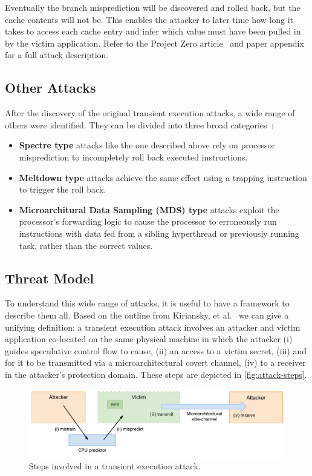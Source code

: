 Eventually the branch misprediction will be discovered and rolled back, but the cache contents will not be.
This enables the attacker to later time how long it takes to access each cache entry and infer which value must have been pulled in by the victim application.
Refer to the Project Zero article~\cite{project-zero:spectre} and paper appendix~\cite{kocher:spectre} for a full attack description.

\subsection{Other Attacks}
After the discovery of the original transient execution attacks, a wide range of others were identified.
They can be divided into three broad categories~\cite{hill:survey}:
\begin{itemize}
\item \textbf{Spectre type} attacks like the one described above rely on processor misprediction to incompletely roll back executed instructions.
\item \textbf{Meltdown type} attacks achieve the same effect using a trapping instruction to trigger the roll back.
\item \textbf{Microarchitural Data Sampling (MDS) type} attacks exploit the processor's forwarding logic to cause the processor to erroneously run instructions with data fed from a sibling hyperthread or previously running task, rather than the correct values.
\end{itemize}

\subsection{Threat Model}

To understand this wide range of attacks, it is useful to have a framework to describe them all.
Based on the outline from Kiriansky, et al.~\cite{kiriansky:dawg} we can give a unifying definition: a transient execution attack involves an attacker and victim application co-located on the same physical machine in which the attacker (i) guides speculative control flow to cause, (ii) an access to a victim secret, (iii) and for it to be transmitted via a microarchitectural covert channel, (iv) to a receiver in the attacker's protection domain.
These steps are depicted in \autoref{fig:attack-steps}.

\begin{figure}[h]
    \includegraphics[width=\columnwidth]{AttackSteps.pdf}
    \caption{Steps involved in a transient execution attack.}
    \label{fig:attack-steps}
\end{figure}


